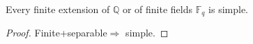 \documentclass[openany]{book}
\newcommand{\Z}{\mathbb{Z}}
\newcommand{\F}{\mathbb{F}}
\newcommand{\Q}{\mathbb{Q}}
\begin{document}

\begin{prop}
    Every finite extension of $\Q$ or of finite fields $\F_q$ is simple.
\end{prop}
\begin{proof}
    Finite+separable$\Rightarrow$ simple.
\end{proof}












\end{document}
